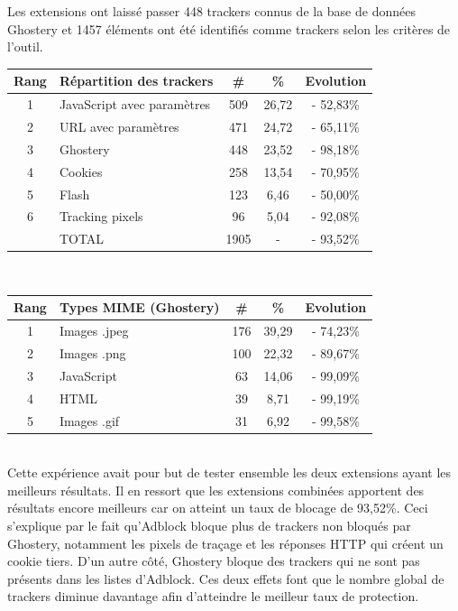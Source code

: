 Les extensions ont laissé passer 448 trackers connus de la base de données Ghostery et 1457 éléments ont été identifiés comme trackers selon les critères de l'outil.\\

\begin{tabular}{ c | p{5cm} | c | c || c | }
   Rang & Répartition des trackers & \# & \% & Evolution \\
   \hline
   \hline
   1 & JavaScript avec paramètres & 509 & 26,72 & - 52,83\% \\
   2 & URL avec paramètres & 471 & 24,72 & - 65,11\% \\
   3 & Ghostery & 448 & 23,52 & - 98,18\% \\
   4 & Cookies & 258 & 13,54 & - 70,95\% \\
   5 & Flash & 123 & 6,46 & - 50,00\% \\
   6 & Tracking pixels & 96 & 5,04 & - 92,08\% \\
   \hline
    & TOTAL & 1905 & - & - 93,52\%\\
   \hline
\end{tabular}
\\[1cm]

\begin{tabular}{ c | p{5cm} | c | c | c | }
   Rang & Types MIME (Ghostery) & \# & \% & Evolution\\
   \hline
   \hline
   1 & Images .jpeg & 176 & 39,29 & - 74,23\% \\
   2 & Images .png & 100 & 22,32 & - 89,67\% \\
   3 & JavaScript & 63 & 14,06 & - 99,09\% \\
   4 & HTML & 39 & 8,71 & - 99,19\% \\
   5 & Images .gif & 31 & 6,92 & - 99,58\% \\
   \hline
\end{tabular}
\\[.3cm]

Cette expérience avait pour but de tester ensemble les deux extensions ayant les meilleurs résultats. Il en ressort que les extensions combinées apportent des résultats encore meilleurs car on atteint un taux de blocage de 93,52\%. Ceci s'explique par le fait qu'Adblock bloque plus de trackers non bloqués par Ghostery, notamment les pixels de traçage et les réponses HTTP qui créent un cookie tiers. D'un autre côté, Ghostery bloque des trackers qui ne sont pas présents dans les listes d'Adblock. Ces deux effets font que le nombre global de trackers diminue davantage afin d'atteindre le meilleur taux de protection.


